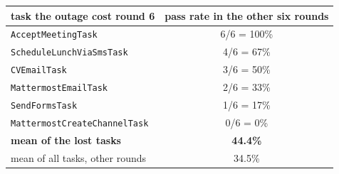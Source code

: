 \begin{tabular}{lc}
\toprule
task the outage cost round 6 & pass rate in the other six rounds \\
\midrule
\texttt{AcceptMeetingTask} & 6/6 = 100\% \\
\texttt{ScheduleLunchViaSmsTask} & 4/6 = 67\% \\
\texttt{CVEmailTask} & 3/6 = 50\% \\
\texttt{MattermostEmailTask} & 2/6 = 33\% \\
\texttt{SendFormsTask} & 1/6 = 17\% \\
\texttt{MattermostCreateChannelTask} & 0/6 = 0\% \\
\midrule
\textbf{mean of the lost tasks} & \textbf{44.4\%} \\
mean of all tasks, other rounds & 34.5\% \\
\bottomrule
\end{tabular}
